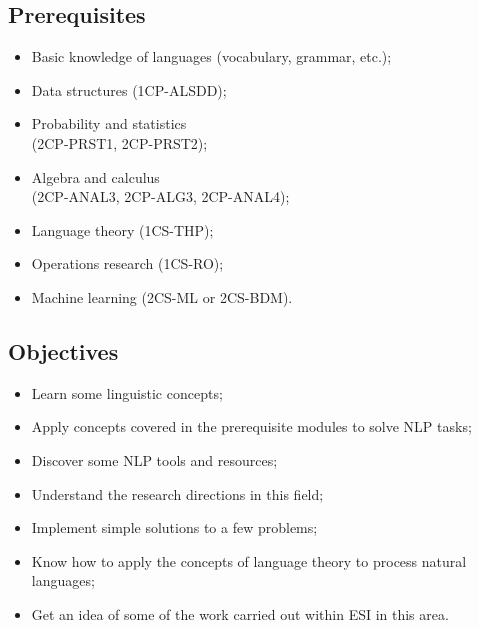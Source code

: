 \documentclass[11pt, a4paper]{article}
\begin{document}
\begin{minipage}{0.44\textwidth}
		
	\subsection{Prerequisites}
	
	\begin{itemize}
		\item Basic knowledge of languages (vocabulary, grammar, etc.);
		\item Data structures (1CP-ALSDD);
		\item Probability and statistics \\(2CP-PRST1, 2CP-PRST2);
		\item Algebra and calculus \\(2CP-ANAL3, 2CP-ALG3, 2CP-ANAL4);
		\item Language theory (1CS-THP);
		\item Operations research (1CS-RO);
		\item Machine learning (2CS-ML or 2CS-BDM).
	\end{itemize}

\end{minipage}
\begin{minipage}{0.05\textwidth}
	\hspace{2pt}
\end{minipage}
\begin{minipage}{0.49\textwidth}
	\subsection{Objectives}
	
	\begin{itemize}
		\item Learn some linguistic concepts;
		\item Apply concepts covered in the prerequisite modules to solve NLP tasks;
		\item Discover some NLP tools and resources;
		\item Understand the research directions in this field;
		\item Implement simple solutions to a few problems;
		\item Know how to apply the concepts of language theory to process natural languages;
		\item Get an idea of some of the work carried out within ESI in this area.
	\end{itemize}
	
\end{minipage}
\end{document}
